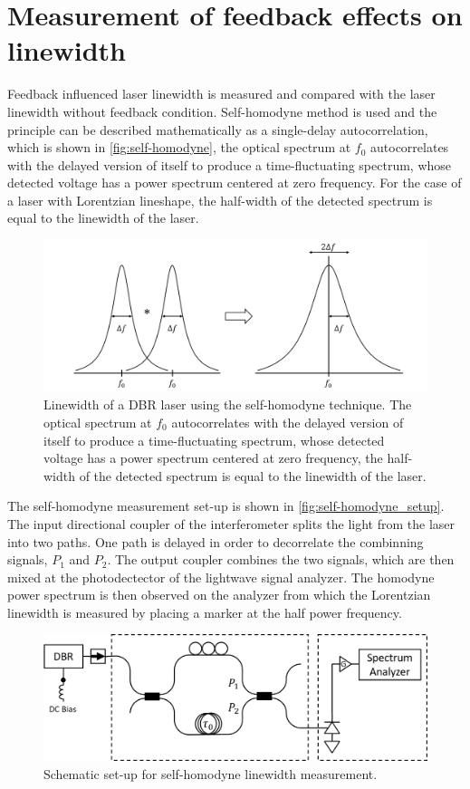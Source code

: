 
\section{Measurement of feedback effects on linewidth}\label{sec:linewidth_measurement}
Feedback influenced laser linewidth is measured and compared with the laser linewidth without feedback condition. Self-homodyne method is used and the principle can be described mathematically as a single-delay autocorrelation, which is shown in \autoref{fig:self-homodyne}, the optical spectrum at $f_0$ autocorrelates with the delayed version of itself to produce a time-fluctuating spectrum, whose detected voltage has a power spectrum centered at zero frequency. For the case of a laser with Lorentzian lineshape, the half-width of the detected spectrum is equal to the linewidth of the laser.
\begin{figure}[ht]
    \centering
    \includegraphics[width=.8\linewidth]{figures/self-homodyne.png}
    \caption{Linewidth of a DBR laser using the self-homodyne technique. The optical spectrum at $f_0$ autocorrelates with the delayed version of itself to produce a time-fluctuating spectrum, whose detected voltage has a power spectrum centered at zero frequency, the half-width of the detected spectrum is equal to the linewidth of the laser.}
    \label{fig:self-homodyne}
\end{figure}

The self-homodyne measurement set-up is shown in \autoref{fig:self-homodyne_setup}. The input directional coupler of the interferometer splits the light from the laser into two paths. One path is delayed in order to decorrelate the combinning signals, $P_1$ and $P_2$. The output coupler combines the two signals, which are then mixed at the photodectector of the lightwave signal analyzer.  The homodyne power spectrum is then observed on the analyzer from which the Lorentzian linewidth is measured by placing a marker at the half power frequency.
\begin{figure}[ht]
    \centering
    \includegraphics[width=.8\linewidth]{figures/self-homodyne_setup.png}
    \caption{Schematic set-up for self-homodyne linewidth measurement.}
    \label{fig:self-homodyne_setup}
\end{figure}

